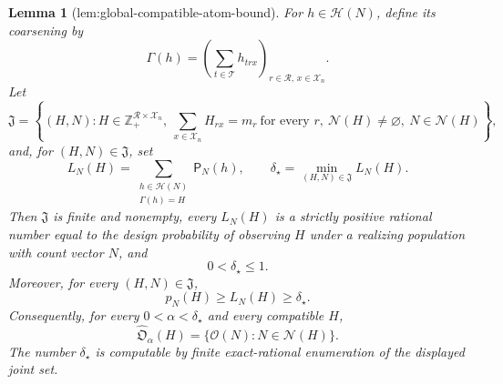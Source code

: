 \documentclass{article}
\newtheorem{lemma}{Lemma}
\begin{document}
\begin{lemma}[lem:global-compatible-atom-bound]\label{lem:global-compatible-atom-bound}
For \(h\in\mathcal H(N)\), define its coarsening by
\[
 \Gamma(h)=\left(\sum_{t\in\mathcal T}h_{trx}\right)_{r\in\mathcal R,\,x\in\mathcal X_n}.
\]
Let
\[
 \mathfrak J=\left\{(H,N):
 H\in\mathbb Z_+^{\mathcal R\times\mathcal X_n},\ 
 \sum_{x\in\mathcal X_n}H_{rx}=m_r\ \text{for every }r,\ 
 \mathcal N(H)\ne\varnothing,\ N\in\mathcal N(H)\right\},
\]
and, for \((H,N)\in\mathfrak J\), set
\[
 L_N(H)=\sum_{\substack{h\in\mathcal H(N)\\ \Gamma(h)=H}}\mathsf P_N(h),
 \qquad
 \delta_\star=\min_{(H,N)\in\mathfrak J}L_N(H).
\]
Then \(\mathfrak J\) is finite and nonempty, every \(L_N(H)\) is a strictly positive rational number equal to the design probability of observing \(H\) under a realizing population with count vector \(N\), and
\[
 0<\delta_\star\le1.
\]
Moreover, for every \((H,N)\in\mathfrak J\),
\[
 p_N(H)\ge L_N(H)\ge\delta_\star.
\]
Consequently, for every \(0<\alpha<\delta_\star\) and every compatible \(H\),
\[
 \widehat{\mathfrak O}_{\alpha}(H)
 =\{\mathcal O(N):N\in\mathcal N(H)\}.
\]
The number \(\delta_\star\) is computable by finite exact-rational enumeration of the displayed joint set.
\end{lemma}
\end{document}

